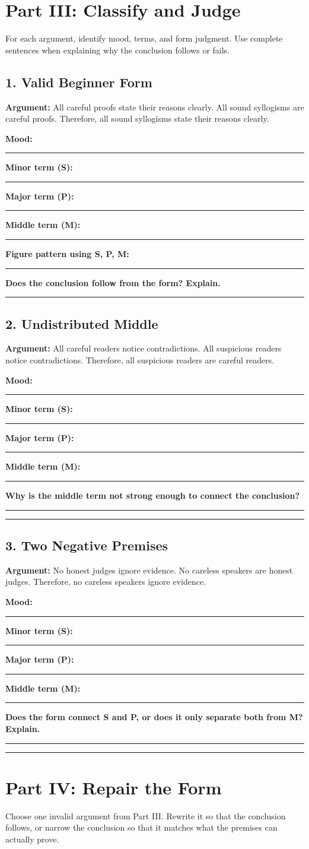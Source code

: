 \documentclass[12pt]{article}
\newcommand{\studentline}{\vspace{0.35em}\hrule\vspace{0.65em}}
\newcommand{\shortline}{\vspace{0.25em}\hrule\vspace{0.45em}}
\begin{document}
\section*{Part III: Classify and Judge}
For each argument, identify mood, terms, and form judgment. Use complete sentences when explaining why the conclusion follows or fails.

\subsection*{1. Valid Beginner Form}
\textbf{Argument:} All careful proofs state their reasons clearly. All sound syllogisms are careful proofs. Therefore, all sound syllogisms state their reasons clearly.

\textbf{Mood:}\shortline
\textbf{Minor term (S):}\shortline
\textbf{Major term (P):}\shortline
\textbf{Middle term (M):}\shortline
\textbf{Figure pattern using S, P, M:}\studentline
\textbf{Does the conclusion follow from the form? Explain.}\studentline

\subsection*{2. Undistributed Middle}
\textbf{Argument:} All careful readers notice contradictions. All suspicious readers notice contradictions. Therefore, all suspicious readers are careful readers.

\textbf{Mood:}\shortline
\textbf{Minor term (S):}\shortline
\textbf{Major term (P):}\shortline
\textbf{Middle term (M):}\shortline
\textbf{Why is the middle term not strong enough to connect the conclusion?}\studentline\studentline

\subsection*{3. Two Negative Premises}
\textbf{Argument:} No honest judges ignore evidence. No careless speakers are honest judges. Therefore, no careless speakers ignore evidence.

\textbf{Mood:}\shortline
\textbf{Minor term (S):}\shortline
\textbf{Major term (P):}\shortline
\textbf{Middle term (M):}\shortline
\textbf{Does the form connect S and P, or does it only separate both from M? Explain.}\studentline\studentline

\section*{Part IV: Repair the Form}
Choose one invalid argument from Part III. Rewrite it so that the conclusion follows, or narrow the conclusion so that it matches what the premises can actually prove.
\end{document}
